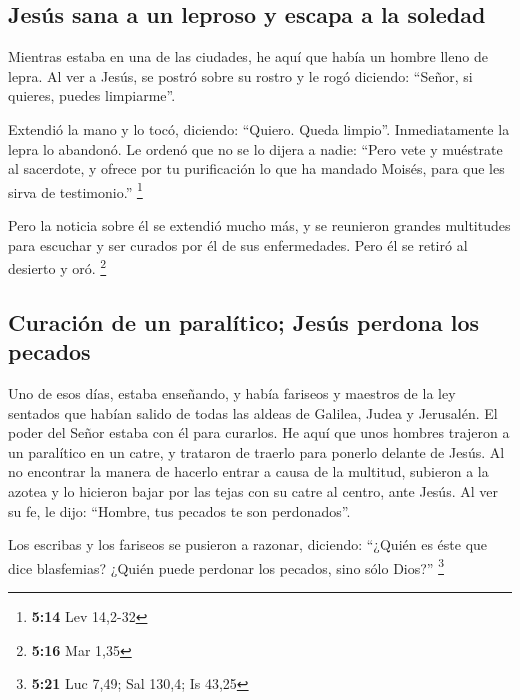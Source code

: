 \begin{paracol}{2}
\hypertarget{jesuxfas-sana-a-un-leproso-y-escapa-a-la-soledad}{%
\subsection{Jesús sana a un leproso y escapa a la
soledad}\label{jesuxfas-sana-a-un-leproso-y-escapa-a-la-soledad}}

 Mientras estaba en una de las ciudades, he aquí que
había un hombre lleno de lepra. Al ver a Jesús, se postró sobre su
rostro y le rogó diciendo: ``Señor, si quieres, puedes limpiarme''.

 Extendió la mano y lo tocó, diciendo: ``Quiero. Queda
limpio''. Inmediatamente la lepra lo abandonó.  Le ordenó
que no se lo dijera a nadie: ``Pero vete y muéstrate al sacerdote, y
ofrece por tu purificación lo que ha mandado Moisés, para que les sirva
de testimonio.'' \footnote{\textbf{5:14} Lev 14,2-32}

 Pero la noticia sobre él se extendió mucho más, y se
reunieron grandes multitudes para escuchar y ser curados por él de sus
enfermedades.  Pero él se retiró al desierto y oró.
\footnote{\textbf{5:16} Mar 1,35}

\hypertarget{curaciuxf3n-de-un-paraluxedtico-jesuxfas-perdona-los-pecados}{%
\subsection{Curación de un paralítico; Jesús perdona los
pecados}\label{curaciuxf3n-de-un-paraluxedtico-jesuxfas-perdona-los-pecados}}

 Uno de esos días, estaba enseñando, y había fariseos y
maestros de la ley sentados que habían salido de todas las aldeas de
Galilea, Judea y Jerusalén. El poder del Señor estaba con él para
curarlos.  He aquí que unos hombres trajeron a un
paralítico en un catre, y trataron de traerlo para ponerlo delante de
Jesús.  Al no encontrar la manera de hacerlo entrar a
causa de la multitud, subieron a la azotea y lo hicieron bajar por las
tejas con su catre al centro, ante Jesús.  Al ver su fe,
le dijo: ``Hombre, tus pecados te son perdonados''.

 Los escribas y los fariseos se pusieron a razonar,
diciendo: ``¿Quién es éste que dice blasfemias? ¿Quién puede perdonar
los pecados, sino sólo Dios?'' \footnote{\textbf{5:21} Luc 7,49; Sal
  130,4; Is 43,25}


\end{paracol}
